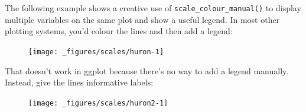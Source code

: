 The following example shows a creative use of
\texttt{scale\_colour\_manual()} to display multiple variables on the
same plot and show a useful legend. In most other plotting systems,
you'd colour the lines and then add a legend: 

\begin{Shaded}
\begin{Highlighting}[]
\StringTok{ }\NormalTok{(} \NormalTok{:}\NormalTok{, } 
\StringTok{  }\NormalTok{(}\NormalTok{(} \StringTok{ }\NormalTok{), } \NormalTok{) +}
\StringTok{  }\NormalTok{(}\NormalTok{(} \StringTok{ }\NormalTok{), } \NormalTok{) }
\end{Highlighting}
\end{Shaded}

\begin{figure}[H]
  \centering
  \texttt{[image: \_figures/scales/huron-1]}
\end{figure}

That doesn't work in ggplot because there's no way to add a legend
manually. Instead, give the lines informative labels:

\begin{Shaded}
\begin{Highlighting}[]
\StringTok{  }\NormalTok{(}\NormalTok{(} \StringTok{ }\NormalTok{, } \NormalTok{)) +}
\StringTok{  }\NormalTok{(}\NormalTok{(} \StringTok{ }\NormalTok{, } \NormalTok{)) }
\end{Highlighting}
\end{Shaded}

\begin{figure}[H]
  \centering
  \texttt{[image: \_figures/scales/huron2-1]}
\end{figure}

